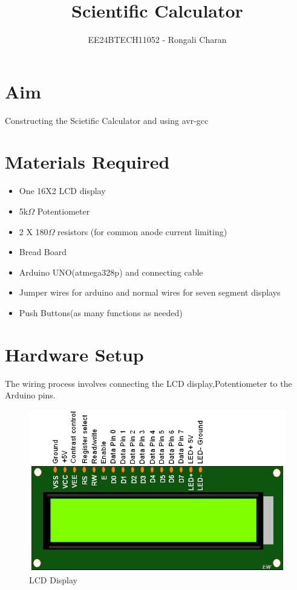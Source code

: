 \documentclass[journal]{IEEEtran}
\begin{document}

\vspace{3cm}

\title{Scientific Calculator}
\author{EE24BTECH11052 - Rongali Charan}
{\let\newpage\relax\maketitle}

\renewcommand{\thefigure}{\theenumi}
\renewcommand{\thetable}{\theenumi}
\setlength{\intextsep}{10pt} %


\renewcommand{\thetable}{\theenumi}
\tableofcontents
\newpage

\section{\textbf{Aim}}
Constructing the Scietific Calculator and using avr-gcc

    \section{ \textbf{Materials Required}}
\begin{itemize}
 \item  One 16X2 LCD display
    \item 5k$\Omega$ Potentiometer
    \item 2 X 180$\Omega$ resistors (for common anode current limiting)
    \item Bread Board
    \item Arduino UNO(atmega328p) and connecting cable
    \item Jumper wires for arduino and normal wires for seven segment displays
    \item Push Buttons(as many functions as needed)
\end{itemize}
\section{Hardware Setup}
The wiring process involves connecting the LCD display,Potentiometer to the Arduino pins.
\begin{figure}[H]
    \centering
    \includegraphics[width=0.6\linewidth]{Figs/LCD.png}
    \caption{LCD Display}
    \label{fig:enter-label}
\end{figure}
\end{document}
